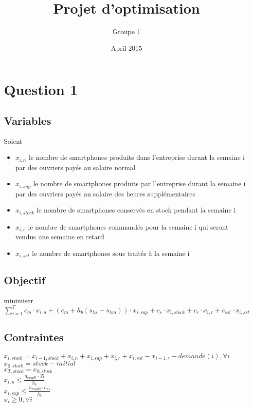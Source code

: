 \documentclass{article}
\title{Projet d'optimisation}
\author{Groupe 1}
\date{April 2015}
\begin{document}
\maketitle

\section{Question 1}

\subsection*{Variables}
Soient 
\begin{itemize}
\item $x_{i,n}$ le nombre de smartphones produits dans l'entreprise durant la semaine i par des ouvriers payés au salaire normal
\item $x_{i,sup}$ le nombre de smartphones produits par l'entreprise durant la semaine i par des ouvriers payés au salaire des heures supplémentaires

\item $x_{i,stock}$ le nombre de smartphones conservés en stock pendant la semaine i
\item $x_{i,r}$ le nombre de smartphones commandés pour la semaine i qui seront vendus une semaine en retard
\item $x_{i,sst}$ le nombre de smartphones sous traités à la semaine i
\end{itemize}

\subsection*{Objectif}

minimiser $\sum_{i=1}^{T} c_m \cdot x_{i,n} + (c_m + h_b (s_{hs} - s_{hm})) \cdot x_{i,sup} + c_s \cdot x_{i,stock} + c_r \cdot x_{i,r} + c_{sst} \cdot x_{i,sst} $

\subsection*{Contraintes}

$x_{i,stock} = x_{i-1,stock} + x_{i,n} + x_{i,sup} + x_{i,r} + x_{i,sst} - x_{i-1,r} - demande(i), \forall i$ \\
$x_{0, stock} = stock-initial$ \\
$x_{T, stock} = x_{0, stock}$ \\
$x_{i,n} \leq \frac{n_{empl0} \cdot 35}{h_b}$ \\
$x_{i,sup} \leq \frac{n_{empl0} \cdot h_{ss}}{h_{b}}$ \\
$x_i \geq 0, \forall i$ \\
\end{document}
